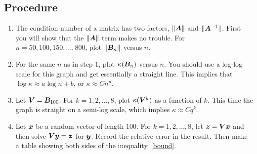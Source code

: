 \documentclass[11pt]{article}
\begin{document}
\subsection*{Procedure}

\begin{enumerate}
\item The condition number of a matrix has two factors, $\|\bm{A}\|$ and $\|\bm{A}^{-1}\|$. First you will show that the $\|\bm{A}\|$ term makes no trouble. For $n=50,100,150,\ldots,800$, plot $\|\bm{B}_n\|$ versus $n$. 

\item For the same $n$ as in step 1, plot $\kappa(\bm{B}_n)$ versus $n$. You should use a log-log scale for this graph and get essentially a straight line. This implies that $\log \kappa \approx a \log n + b$, or $\kappa \approx C n^p$. 

\item Let $\bm{V}=\bm{B}_{100}$. For $k=1,2,\ldots,8$, plot $\kappa(\bm{V}^k)$ as a function of $k$. This time the graph is straight on a semi-log scale, which implies $\kappa \approx C q^k$. 

\item Let $\bm{x}$ be a random vector of length 100. For $k=1,2,\ldots,8$, let $\bm{z}=\bm{V}\bm{x}$ and then solve $\bm{V}\bm{y}=\bm{z}$ for $\bm{y}$. Record the relative error in the result. Then make a table showing both sides of the inequality~\eqref{bound}.

\end{enumerate}
\end{document}
